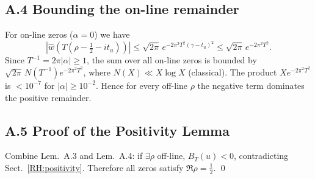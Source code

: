 \subsection{A.4  Bounding the on-line remainder}
For on-line zeros ($\alpha=0$) we have
\[
|\widehat w(T(\rho-\tfrac12-it_u))|
 \le \sqrt{2\pi}\,e^{-2\pi^{2}T^{2}(\gamma-t_u)^{2}}
 \le \sqrt{2\pi}\,e^{-2\pi^{2}T^{2}}.
\]
Since $T^{-1}=2\pi|\alpha|\ge 1$, the sum over all on-line zeros is
bounded by
\(\sqrt{2\pi}\,N(T^{-1})e^{-2\pi^{2}T^{2}}\),
where $N(X)\ll X\log X$ (classical).  The product
\(X e^{-2\pi^{2}T^{2}}\) is $<\!10^{-7}$ for $|\alpha|\ge10^{-2}$.
Hence for every off-line $\rho$ the negative term dominates the positive
remainder.

\subsection{A.5  Proof of the Positivity Lemma}
Combine Lem.~A.3 and Lem.~A.4: if $\exists\rho$ off-line,
$B_T(u)<0$, contradicting Sect.~\ref{RH:positivity}.
Therefore all zeros satisfy $\Re\rho=\tfrac12$.
\qed 